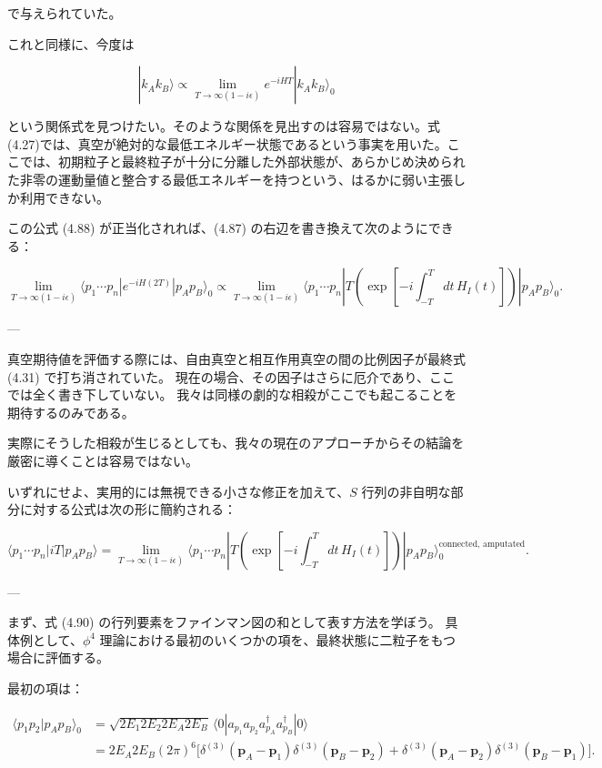 \documentclass[a4paper,12pt]{article}
\begin{document}
で与えられていた。  

これと同様に、今度は

\begin{equation}
|k_A k_B\rangle \propto 
\lim_{T\to\infty(1-i\epsilon)} e^{-iHT} |k_A k_B\rangle_0
\tag{4.88}
\end{equation}

という関係式を見つけたい。そのような関係を見出すのは容易ではない。式(4.27)では、真空が絶対的な最低エネルギー状態であるという事実を用いた。ここでは、初期粒子と最終粒子が十分に分離した外部状態が、あらかじめ決められた非零の運動量値と整合する最低エネルギーを持つという、はるかに弱い主張しか利用できない。

この公式 (4.88) が正当化されれば、(4.87) の右辺を書き換えて次のようにできる：

\begin{equation}
\lim_{T \to \infty(1-i\epsilon)} \langle p_1 \cdots p_n| e^{-iH(2T)} |p_A p_B\rangle_0
\propto \lim_{T \to \infty(1-i\epsilon)} 
\langle p_1 \cdots p_n| T\!\left(\exp\!\left[-i \int_{-T}^{T} dt\, H_I(t)\right]\right)|p_A p_B\rangle_0.
\tag{4.89}
\end{equation}

---

真空期待値を評価する際には、自由真空と相互作用真空の間の比例因子が最終式 (4.31) で打ち消されていた。  
現在の場合、その因子はさらに厄介であり、ここでは全く書き下していない。  
我々は同様の劇的な相殺がここでも起こることを期待するのみである。  

実際にそうした相殺が生じるとしても、我々の現在のアプローチからその結論を厳密に導くことは容易ではない。  

いずれにせよ、実用的には無視できる小さな修正を加えて、$S$ 行列の非自明な部分に対する公式は次の形に簡約される：

\begin{equation}
\langle p_1 \cdots p_n| iT | p_A p_B\rangle
= \lim_{T \to \infty(1-i\epsilon)} 
\langle p_1 \cdots p_n| T\!\left(\exp\!\left[-i \int_{-T}^{T} dt\, H_I(t)\right]\right) |p_A p_B\rangle_0^{\text{connected, amputated}}.
\tag{4.90}
\end{equation}

---

まず、式 (4.90) の行列要素をファインマン図の和として表す方法を学ぼう。  
具体例として、$\phi^4$ 理論における最初のいくつかの項を、最終状態に二粒子をもつ場合に評価する。  

最初の項は：

\begin{align}
\langle p_1 p_2| p_A p_B\rangle_0
&= \sqrt{2E_1 2E_2 2E_A 2E_B} \, \langle 0| a_{p_1} a_{p_2} a_{p_A}^\dagger a_{p_B}^\dagger |0\rangle \\
&= 2E_A 2E_B (2\pi)^6 \Big[ \delta^{(3)}(\mathbf{p}_A-\mathbf{p}_1)\delta^{(3)}(\mathbf{p}_B-\mathbf{p}_2)
+ \delta^{(3)}(\mathbf{p}_A-\mathbf{p}_2)\delta^{(3)}(\mathbf{p}_B-\mathbf{p}_1)\Big].
\tag{4.91}
\end{align}
\end{document}
